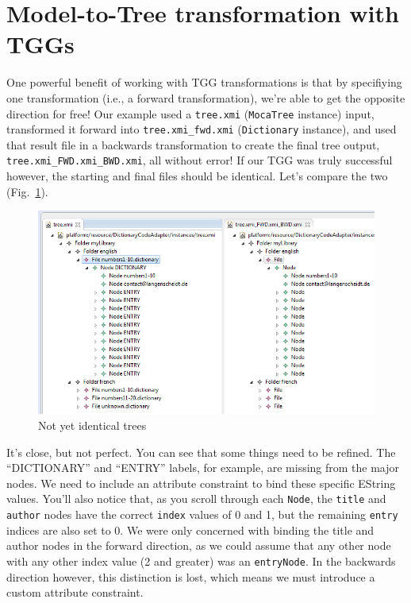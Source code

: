 \newpage
\section{Model-to-Tree transformation with TGGs}
\genHeader

One powerful benefit of working with TGG transformations is that by specifiying one transformation (i.e., a forward transformation), we're able to get the
opposite direction for free! Our example used a \texttt{tree.xmi} (\texttt{MocaTree}
instance) input, transformed it forward into \texttt{tree.xmi\_fwd.xmi} (\texttt{Dictionary} instance), and used that result file in a backwards
transformation to create the final tree output, \texttt{tree.xmi\_FWD.xmi\_BWD.xmi}, all without error! If our TGG was truly successful however,
the starting and final files should be identical. Let's compare the two (Fig.~\ref{eclipse:comparingTreeModels}).

\vspace{0.5cm}

\begin{figure}[htpb]
\begin{center}
  \includegraphics[width=\textwidth]{eclipse_generatedBackwardsModel}
  \caption{Not yet identical trees}
  \label{eclipse:comparingTreeModels}
\end{center}
\end{figure}

\vspace{0.5cm}

It's close, but not perfect. You can see that some things need to be refined. The ``DICTIONARY'' and ``ENTRY'' labels, for example, are missing from the
major nodes. We need to include an attribute constraint to bind these specific EString values. You'll also notice that, as you scroll through each
\texttt{Node}, the \texttt{title} and \texttt{author} nodes have the correct \texttt{index} values of 0 and 1, but the remaining \texttt{entry} indices are also
set to 0.
We were only concerned with binding the title and author nodes in the forward direction, as we could assume that any other node with any other index value (2 and greater) was an
\texttt{entryNode}. In the backwards direction however, this distinction is lost, which means we must introduce a custom attribute constraint.








